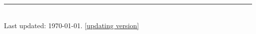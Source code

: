 \documentclass[11pt]{article} %
\begin{document}
%


\centering
\rule{0.25\linewidth}{0.4pt}\\
\medskip
Last updated: \today. \href{https://ynbsztl.github.io/CV_Tianlei.pdf}{[updating version]}
\end{document}
